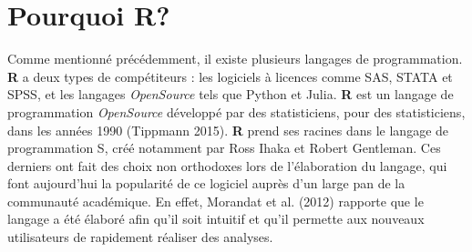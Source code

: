 \documentclass[
  letterpaper,
]{scrbook}
\begin{document}
\hypertarget{pourquoi-r}{%
\section{Pourquoi R?}\label{pourquoi-r}}

Comme mentionné précédemment, il existe plusieurs langages de
programmation. \textbf{R} a deux types de compétiteurs : les logiciels à
licences comme SAS, STATA et SPSS, et les langages \emph{OpenSource}
tels que Python et Julia. \textbf{R} est un langage de programmation
\emph{OpenSource} développé par des statisticiens, pour des
statisticiens, dans les années 1990 (Tippmann 2015). \textbf{R} prend
ses racines dans le langage de programmation S, créé notamment par Ross
Ihaka et Robert Gentleman. Ces derniers ont fait des choix non
orthodoxes lors de l'élaboration du langage, qui font aujourd'hui la
popularité de ce logiciel auprès d'un large pan de la communauté
académique. En effet, Morandat et al. (2012) rapporte que le langage a
été élaboré afin qu'il soit intuitif et qu'il permette aux nouveaux
utilisateurs de rapidement réaliser des analyses.
\end{document}
